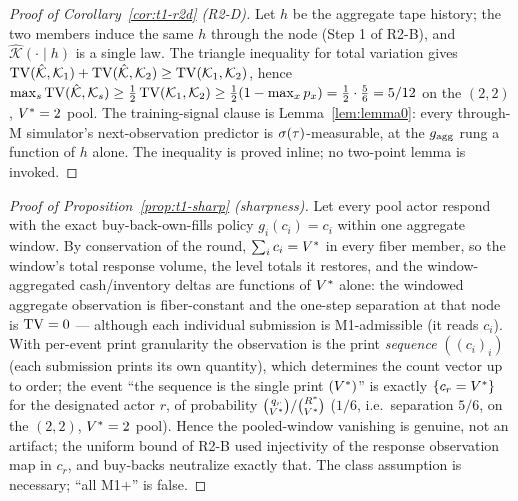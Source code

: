 
\begin{proof}[Proof of Corollary~\ref{cor:t1-r2d} (R2-D)]
Let $h$ be the aggregate tape history; the two members induce the same $h$
through the node (Step 1 of R2-B), and
$\hat{\mathcal{K}}(\cdot \mid h)$ is a single law. The triangle inequality
for total variation gives
$\operatorname{TV}(\hat{\mathcal{K}}, \mathcal{K}_1) + \operatorname{TV}(\hat{\mathcal{K}},
\mathcal{K}_2) \geq \operatorname{TV}(\mathcal{K}_1, \mathcal{K}_2)$, hence
$\max_{s} \operatorname{TV}(\hat{\mathcal{K}}, \mathcal{K}_s) \geq
\tfrac{1}{2}\operatorname{TV}(\mathcal{K}_1, \mathcal{K}_2) \geq
\tfrac{1}{2}(1 - \max_x p_x) = \tfrac{1}{2}\cdot\tfrac{5}{6} = 5/12$ on
the $(2,2)$, $V^{*} = 2$ pool. The training-signal clause is
Lemma~\ref{lem:lemma0}: every through-M simulator's next-observation
predictor is $\sigma(\tau)$-measurable, at the $g_{\mathrm{agg}}$ rung a function of
$h$ alone. The inequality is proved inline; no two-point lemma is invoked.
\end{proof}


\begin{proof}[Proof of Proposition~\ref{prop:t1-sharp} (sharpness)]
Let every pool actor respond with the exact buy-back-own-fills policy
$g_i(c_i) = c_i$ within one aggregate window. By conservation of the
round, $\sum_i c_i = V^{*}$ in every fiber member, so the window's total
response volume, the level totals it restores, and the window-aggregated
cash/inventory deltas are functions of $V^{*}$ alone: the windowed
aggregate observation is fiber-constant and the one-step separation at
that node is $\operatorname{TV} = 0$ --- although each individual submission is
M1-admissible (it reads $c_i$). With per-event print granularity the
observation is the print \emph{sequence} $((c_i)_i)$ (each submission
prints its own quantity), which determines the count vector up to order;
the event ``the sequence is the single print $(V^{*})$'' is exactly
$\{c_r = V^{*}\}$ for the designated actor $r$, of probability
$\binom{q_r}{V^{*}}/\binom{R^{*}}{V^{*}}$ ($1/6$, i.e.\ separation
$5/6$, on the $(2,2)$, $V^{*} = 2$ pool). Hence the pooled-window
vanishing is genuine, not an artifact; the uniform bound of R2-B used
injectivity of the response observation map in $c_r$, and buy-backs
neutralize exactly that. The class assumption is necessary; ``all M1$+$''
is false.
\end{proof}


